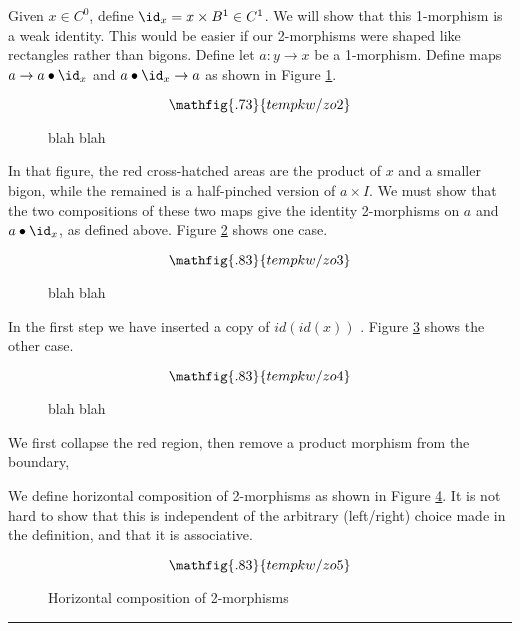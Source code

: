 Given $x\in C^0$, define $\id_x = x\times B^1 \in C^1$.
We will show that this 1-morphism is a weak identity.
This would be easier if our 2-morphisms were shaped like rectangles rather than bigons.
Define let $a: y\to x$ be a 1-morphism.
Define maps $a \to a\bullet \id_x$ and $a\bullet \id_x \to a$
as shown in Figure \ref{fzo2}.
\begin{figure}[t]
\begin{equation*}
\mathfig{.73}{tempkw/zo2}
\end{equation*}
\caption{blah blah}
\label{fzo2}
\end{figure}
In that figure, the red cross-hatched areas are the product of $x$ and a smaller bigon,
while the remained is a half-pinched version of $a\times I$.
We must show that the two compositions of these two maps give the identity 2-morphisms
on $a$ and $a\bullet \id_x$, as defined above.
Figure \ref{fzo3} shows one case.
\begin{figure}[t]
\begin{equation*}
\mathfig{.83}{tempkw/zo3}
\end{equation*}
\caption{blah blah}
\label{fzo3}
\end{figure}
In the first step we have inserted a copy of $id(id(x))$ .
Figure \ref{fzo4} shows the other case.
\begin{figure}[t]
\begin{equation*}
\mathfig{.83}{tempkw/zo4}
\end{equation*}
\caption{blah blah}
\label{fzo4}
\end{figure}
We first collapse the red region, then remove a product morphism from the boundary,

We define horizontal composition of 2-morphisms as shown in Figure \ref{fzo5}.
It is not hard to show that this is independent of the arbitrary (left/right) choice made in the definition, and that it is associative.
\begin{figure}[t]
\begin{equation*}
\mathfig{.83}{tempkw/zo5}
\end{equation*}
\caption{Horizontal composition of 2-morphisms}
\label{fzo5}
\end{figure}



\medskip
\hrule
\medskip

\medskip
